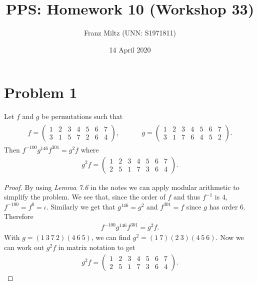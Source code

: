 \documentclass{article}
\title{PPS: Homework 10 (Workshop 33)}
\author{Franz Miltz (UNN: S1971811)}
\date{14 April 2020}
\begin{document}
\maketitle
\section*{Problem 1}
\begin{claim}
  Let $f$ and $g$ be permutations such that
  \begin{align*}
    \begin{aligned}
    f = \begin{pmatrix}
      1&2&3&4&5&6&7\\
      3&1&5&7&2&6&4
    \end{pmatrix},
    \end{aligned}
    \hspace{1cm}
    \begin{aligned}
    g = \begin{pmatrix}
      1&2&3&4&5&6&7\\
      3&1&7&6&4&5&2
    \end{pmatrix}.
    \end{aligned}
  \end{align*}
  Then $f^{-100}g^{146}f^{301}=g^2f$ where
  \begin{align*}
    g^2f=\begin{pmatrix}
      1&2&3&4&5&6&7\\
      2&5&1&7&3&6&4
    \end{pmatrix}.
  \end{align*}
\end{claim}
\begin{proof}
  By using \emph{Lemma 7.6} in the notes we can apply modular arithmetic to simplify the problem. 
  We see that, since the order of $f$ and thus $f^{-1}$ is $4$, $f^{-100} = f^{0} = \iota$.
  Similarly we get that $g^{146}=g^2$ and $f^{301}=f$ since $g$ has order $6$. Therefore
  \begin{align*}
    f^{-100}g^{146}f^{301}=g^2f.
  \end{align*}
  With $g=(1\:3\:7\:2)(4\:6\:5)$, we can find $g^2=(1\:7)(2\:3)(4\:5\:6)$. Now we can work out $g^2f$ in matrix notation to get
  \begin{align*}
    g^2f=\begin{pmatrix}
      1&2&3&4&5&6&7\\
      2&5&1&7&3&6&4
    \end{pmatrix}.
  \end{align*}
\end{proof}
\end{document}
